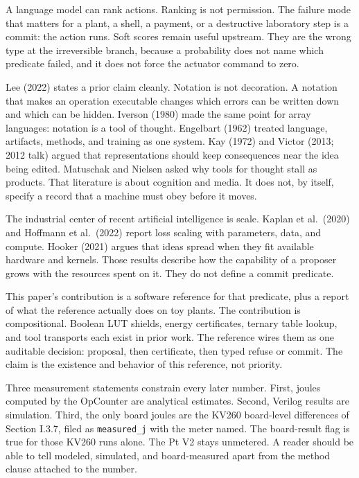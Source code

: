 \documentclass[
  10pt,
]{article}
\begin{document}
A language model can rank actions. Ranking is not permission. The
failure mode that matters for a plant, a shell, a payment, or a
destructive laboratory step is a commit: the action runs. Soft scores
remain useful upstream. They are the wrong type at the irreversible
branch, because a probability does not name which predicate failed, and
it does not force the actuator command to zero.

Lee (2022) states a prior claim cleanly. Notation is not decoration. A
notation that makes an operation executable changes which errors can be
written down and which can be hidden. Iverson (1980) made the same point
for array languages: notation is a tool of thought. Engelbart (1962)
treated language, artifacts, methods, and training as one system. Kay
(1972) and Victor (2013; 2012 talk) argued that representations should
keep consequences near the idea being edited. Matuschak and Nielsen
asked why tools for thought stall as products. That literature is about
cognition and media. It does not, by itself, specify a record that a
machine must obey before it moves.

The industrial center of recent artificial intelligence is scale. Kaplan
et al.~(2020) and Hoffmann et al.~(2022) report loss scaling with
parameters, data, and compute. Hooker (2021) argues that ideas spread
when they fit available hardware and kernels. Those results describe how
the capability of a proposer grows with the resources spent on it. They
do not define a commit predicate.

This paper's contribution is a software reference for that predicate,
plus a report of what the reference actually does on toy plants. The
contribution is compositional. Boolean LUT shields, energy certificates,
ternary table lookup, and tool transports each exist in prior work. The
reference wires them as one auditable decision: proposal, then
certificate, then typed refuse or commit. The claim is the existence and
behavior of this reference, not priority.

Three measurement statements constrain every later number. First, joules
computed by the OpCounter are analytical estimates. Second, Verilog
results are simulation. Third, the only board joules are the KV260
board-level differences of Section I.3.7, filed as \texttt{measured\_j}
with the meter named. The board-result flag is true for those KV260 runs
alone. The Pt V2 stays unmetered. A reader should be able to tell
modeled, simulated, and board-measured apart from the method clause
attached to the number.
\end{document}
